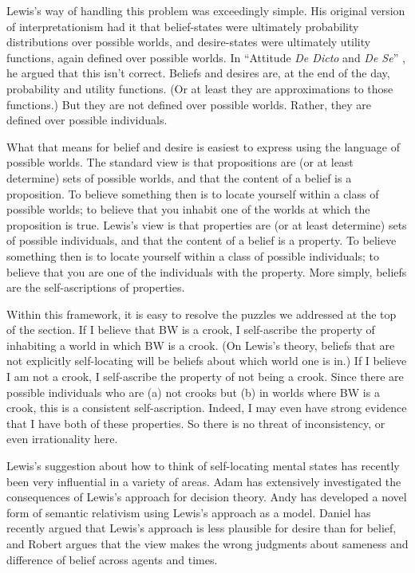 Lewis's way of handling this problem was exceedingly simple. His original version of interpretationism had it that belief-states were ultimately probability distributions over possible worlds, and desire-states were ultimately utility functions, again defined over possible worlds. In ``Attitude \textit{De Dicto} and \textit{De Se}'' \citeyearpar{Lewis1979b}, he argued that this isn't correct. Beliefs and desires are, at the end of the day, probability and utility functions. (Or at least they are approximations to those functions.) But they are not defined over possible worlds. Rather, they are defined over possible individuals.

What that means for belief and desire is easiest to express using the language of possible worlds. The standard view is that propositions are (or at least determine) sets of possible worlds, and that the content of a belief is a proposition. To believe something then is to locate yourself within a class of possible worlds; to believe that you inhabit one of the worlds at which the proposition is true. Lewis's view is that properties are (or at least determine) sets of possible individuals, and that the content of a belief is a property. To believe something then is to locate yourself within a class of possible individuals; to believe that you are one of the individuals with the property. More simply, beliefs are the self-ascriptions of properties.

Within this framework, it is easy to resolve the puzzles we addressed at the top of the section. If I believe that BW is a crook, I self-ascribe the property of inhabiting a world in which BW is a crook. (On Lewis's theory, beliefs that are not explicitly self-locating will be beliefs about which world one is in.) If I believe I am not a crook, I self-ascribe the property of not being a crook. Since there are possible individuals who are (a) not crooks but (b) in worlds where BW is a crook, this is a consistent self-ascription. Indeed, I may even have strong evidence that I have both of these properties. So there is no threat of inconsistency, or even irrationality here.

Lewis's suggestion about how to think of self-locating mental states has recently been very influential in a variety of areas. Adam \citet{Elga2000-ELGSBA, Elga2004-ELGDDE} has extensively investigated the consequences of Lewis's approach for decision theory. Andy \citet{Egan2007-EGAEMR} has developed a novel form of semantic relativism using Lewis's approach as a model. Daniel \citet{Nolan2007} has recently argued that Lewis's approach is less plausible for desire than for belief, and Robert \citet{Stalnaker2008} argues that the view makes the wrong judgments about sameness and difference of belief across agents and times.

